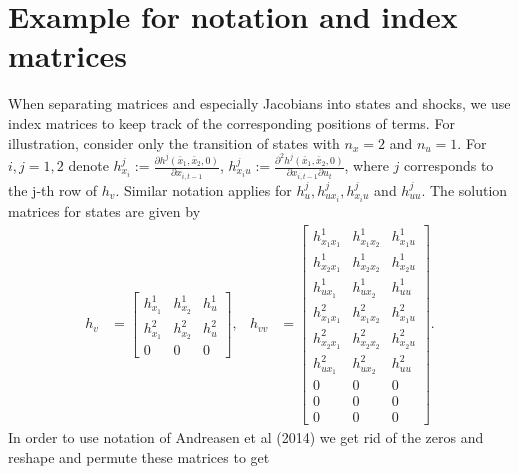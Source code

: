 \documentclass{article}
\begin{document}
\section{Example for notation and index matrices}\label{App:NotationIndex}
When separating matrices and especially Jacobians into states and shocks, we use index matrices to keep track of the corresponding positions of terms. For illustration, consider only the transition of states with $n_x=2$ and $n_u=1$. For $i,j=1,2$ denote $h^j_{x_i} := \frac{\partial h^j(\bar{x}_1,\bar{x}_2,0)}{\partial x_{i,t-1}}$, $h^j_{x_i u} := \frac{\partial^2 h^j(\bar{x}_1,\bar{x}_2,0)}{\partial x_{i,t-1} \partial u_t}$, where $j$ corresponds to the j-th row of $h_v$. Similar notation applies for $h^j_u, h^j_{ux_i}, h^j_{x_i u}$ and $h^j_{uu}$. The solution matrices for states are given by
\begin{align*}
  h_v &= \begin{bmatrix} h^1_{x_1} & h^1_{x_2} & h^1_u \\ h^2_{x_1} & h^2_{x_2} & h^2_u \\0 & 0 & 0 \end{bmatrix},&
  h_{vv} &= \begin{bmatrix} h^1_{x_1x_1} & h^1_{x_1 x_2} & h^1_{x_1 u} \\
                            h^1_{x_2x_1} & h^1_{x_2 x_2} & h^1_{x_2 u} \\
                            h^1_{u x_1}  & h^1_{u x_2}   & h^1_{u u}      \\
                            h^2_{x_1x_1} & h^2_{x_1 x_2} & h^2_{x_1 u} \\
                            h^2_{x_2x_1} & h^2_{x_2 x_2} & h^2_{x_2 u} \\
                            h^2_{u x_1}  & h^2_{u x_2}   & h^2_{u u}      \\
                            0 & 0 &0 \\
                            0 & 0 &0\\
                            0 & 0 &0\end{bmatrix}.
\end{align*}
In order to use notation of Andreasen et al (2014) we get rid of the zeros and reshape and permute these matrices to get
\end{document}
